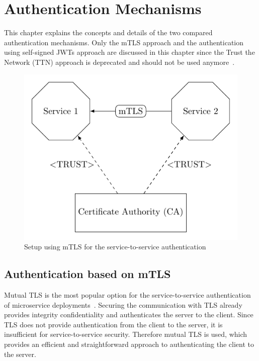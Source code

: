 \chapter{Authentication Mechanisms}
\label{cha:authentication_mechanisms}
This chapter explains the concepts and details of the two compared authentication mechanisms.
Only the mTLS approach and the authentication using self-signed JWTs approach are discussed in this chapter since the Trust the Network (TTN) approach is deprecated and should not be used anymore~\cite{dias2020microservices}.

\begin{figure}
	\centering
	\includegraphics{images/authentication-mechanisms/TikZ_mTLS_base_structure.pdf}
	\caption{Setup using mTLS for the service-to-service authentication~\cite{dias2020microservices}}
	\label{fig:auth_mechanisms_mtls}
\end{figure}

\section{Authentication based on mTLS}
Mutual TLS is the most popular option for the service-to-service authentication of microservice deployments~\cite{dias2020microservices}.
Securing the communication with TLS already provides integrity confidentiality and authenticates the server to the client.
Since TLS does not provide authentication from the client to the server, it is insufficient for service-to-service security.
Therefore mutual TLS is used, which provides an efficient and straightforward approach to authenticating the client to the server.

